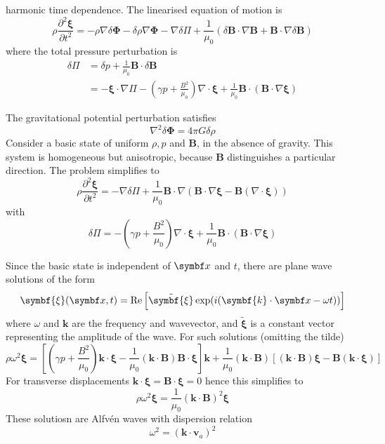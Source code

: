 \documentclass{jknotes}
\newcommand{\B}{\symbf{B}}
\newcommand{\flux}{\symbf{\Phi}}
\newcommand{\disp}{\symbf{\xi}}
\begin{document}
harmonic time dependence. The linearised equation of motion is
\begin{equation}
	\rho \frac{\partial^2 \disp}{\partial t^2} = -\rho \nabla \delta \flux -
	\delta \rho \nabla \flux - \nabla \delta \Pi + \frac{1}{\mu_0}(\delta \B
	\cdot \nabla \B + \B \cdot \nabla \delta \B)
\end{equation}
where the total pressure perturbation is
\begin{align}
	\delta \Pi &= \delta p + \frac{1}{\mu_0}\B \cdot \delta \B \\
			   &= -\disp \cdot \nabla \Pi - \left(\gamma p +
			   \frac{B^2}{\mu_0}\right)\nabla \cdot \disp + \frac{1}{\mu_0} \B \cdot
			   (\B \cdot \nabla \disp)
\end{align}

The gravitational potential perturbation satisfies
\begin{equation}
	\nabla^2 \delta \flux = 4\pi G \delta \rho
\end{equation}
Consider a basic state of uniform $\rho, p$ and $\B$, in the absence of
gravity. This system is homogeneous but anisotropic, because $\B$
distinguishes a particular direction. The problem simplifies to
\begin{equation}
	\rho \frac{\partial^2 \disp}{\partial t^2} = -\nabla \delta \Pi +
	\frac{1}{\mu_0} \B \cdot \nabla (\B \cdot \nabla \disp - \B (\nabla \cdot
	\disp))
\end{equation}
with 
\begin{equation}
	\delta \Pi = -\left(\gamma p + \frac{B^2}{\mu_0}\right)\nabla \cdot \disp +
	\frac{1}{\mu_0}\B \cdot (\B \cdot \nabla \disp)
\end{equation}

Since the basic state is independent of $\x$ and $t$, there are plane wave
solutions of the form
\begin{equation}
	\disp(\x,t) = \Re \left[ \tilde{\disp}\exp(i(\symbf{k}\cdot\x - \omega t))
	\right]
\end{equation}
where $\omega$ and $\symbf{k}$ are the frequency and wavevector, and
$\tilde{\disp}$ is a constant vector representing the amplitude of the wave.
For such solutions (omitting the tilde)
\begin{equation}
	\rho \omega^2 \disp = \left[ \left(\gamma p +
	\frac{B^2}{\mu_0}\right)\symbf{k}\cdot\disp -
	\frac{1}{\mu_0}(\symbf{k}\cdot\B)\B\cdot\disp\right]\symbf{k} +
	\frac{1}{\mu_0}(\symbf{k}\cdot\B)\left[(\symbf{k}\cdot\B)\disp -
	\B(\symbf{k}\cdot\disp)\right]
	\label{eq:5:1}
\end{equation}
For transverse displacements $\symbf{k} \cdot \disp = \B \cdot \disp = 0$
hence this simplifies to
\begin{equation}
	\rho \omega^2 \disp = \frac{1}{\mu_0}(\symbf{k}\cdot\B)^2\disp
\end{equation}
These solutiosn are Alfv\'{e}n waves with dispersion relation
\begin{equation}
	\omega^2 = (\symbf{k}\cdot\symbf{v}_a)^2
\end{equation}
\end{document}
